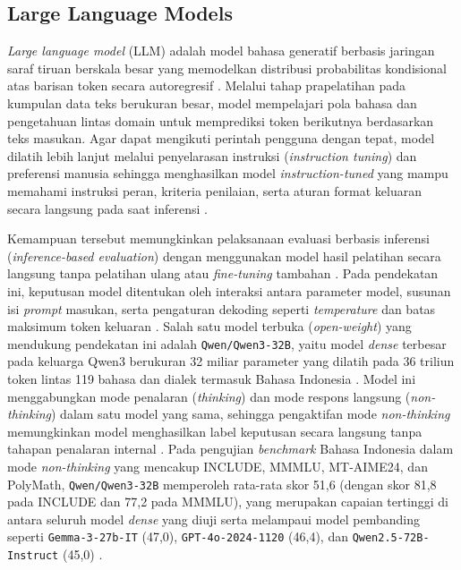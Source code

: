 \subsection{Large Language Models}

\textit{Large language model} (LLM) adalah model bahasa generatif berbasis jaringan saraf tiruan berskala besar yang memodelkan distribusi probabilitas kondisional atas barisan token secara autoregresif \cite{guSurveyLLMasaJudge2025}. Melalui tahap prapelatihan pada kumpulan data teks berukuran besar, model mempelajari pola bahasa dan pengetahuan lintas domain untuk memprediksi token berikutnya berdasarkan teks masukan. Agar dapat mengikuti perintah pengguna dengan tepat, model dilatih lebih lanjut melalui penyelarasan instruksi (\textit{instruction tuning}) dan preferensi manusia sehingga menghasilkan model \textit{instruction-tuned} yang mampu memahami instruksi peran, kriteria penilaian, serta aturan format keluaran secara langsung pada saat inferensi \cite{guSurveyLLMasaJudge2025}\cite{liLLMsasJudgesComprehensiveSurvey2024}.

Kemampuan tersebut memungkinkan pelaksanaan evaluasi berbasis inferensi (\textit{inference-based evaluation}) dengan menggunakan model hasil pelatihan secara langsung tanpa pelatihan ulang atau \textit{fine-tuning} tambahan \cite{guSurveyLLMasaJudge2025}\cite{liLLMsasJudgesComprehensiveSurvey2024}. Pada pendekatan ini, keputusan model ditentukan oleh interaksi antara parameter model, susunan isi \textit{prompt} masukan, serta pengaturan dekoding seperti \textit{temperature} dan batas maksimum token keluaran \cite{bellibatluJudgeSenseBenchmarkPrompt2026}. Salah satu model terbuka (\textit{open-weight}) yang mendukung pendekatan ini adalah \texttt{Qwen/Qwen3-32B}, yaitu model \textit{dense} terbesar pada keluarga Qwen3 berukuran 32 miliar parameter yang dilatih pada 36 triliun token lintas 119 bahasa dan dialek termasuk Bahasa Indonesia \cite{yangQwen3TechnicalReport2025}. Model ini menggabungkan mode penalaran (\textit{thinking}) dan mode respons langsung (\textit{non-thinking}) dalam satu model yang sama, sehingga pengaktifan mode \textit{non-thinking} memungkinkan model menghasilkan label keputusan secara langsung tanpa tahapan penalaran internal \cite{yangQwen3TechnicalReport2025}. Pada pengujian \textit{benchmark} Bahasa Indonesia dalam mode \textit{non-thinking} yang mencakup INCLUDE, MMMLU, MT-AIME24, dan PolyMath, \texttt{Qwen/Qwen3-32B} memperoleh rata-rata skor 51,6 (dengan skor 81,8 pada INCLUDE dan 77,2 pada MMMLU), yang merupakan capaian tertinggi di antara seluruh model \textit{dense} yang diuji serta melampaui model pembanding seperti \texttt{Gemma-3-27b-IT} (47,0), \texttt{GPT-4o-2024-1120} (46,4), dan \texttt{Qwen2.5-72B-Instruct} (45,0) \cite{yangQwen3TechnicalReport2025}.

